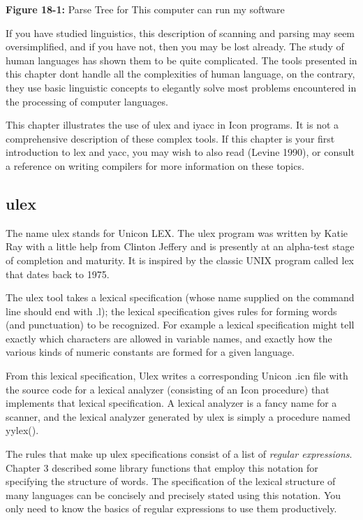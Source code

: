 {\sffamily\bfseries Figure 18-1:}
{\sffamily Parse Tree for {\textquotedbl}This computer can run my
software{\textquotedbl}}

\bigskip

If you have studied linguistics, this description of scanning and
parsing may seem oversimplified, and if you have not, then
you may be lost already.  The study of human languages has shown them
to be quite complicated.  The tools presented in this chapter
don{\textquotesingle}t handle all the complexities of human language,
on the contrary, they use basic linguistic concepts to elegantly solve
most problems encountered in the processing of computer languages.

This chapter illustrates the use of \textsf{ulex} and
\textsf{iyacc} in Icon programs. It is not a comprehensive description
of these complex tools. If this chapter is your first introduction to
\textsf{lex} and \textsf{yacc}, you may wish to also read (Levine
1990), or consult a reference on writing compilers for more information
on these topics.

\subsection{ulex}

The name \textsf{ulex} stands for Unicon LEX. The \textsf{ulex}
program was written by Katie Ray with a little help from Clinton Jeffery
and is presently at an alpha-test stage of completion and maturity.
It is inspired by the classic UNIX program called \textsf{lex} that
dates back to 1975.

The \textsf{ulex} tool takes a lexical specification (whose
name supplied on the command line should end with .l); the lexical
specification gives rules for forming words (and punctuation) to
be recognized.  For example a lexical specification might tell exactly
which characters are allowed in variable names, and exactly how the
various kinds of numeric constants are formed for a given language.

From this lexical specification, Ulex writes a corresponding Unicon
.icn file with the source code for a lexical analyzer (consisting of
an Icon procedure) that implements that lexical
specification. A lexical analyzer is a fancy name for a scanner, and the
lexical analyzer generated by \textsf{ulex} is simply a procedure named
\textsf{yylex()}.

The rules that make up
\textsf{ulex} specifications consist of a list of {\em regular expressions\/}.
Chapter 3 described some library functions that employ  this notation for specifying the structure
of words. The specification of the lexical structure of many languages
can be concisely and precisely stated using this notation. You only
need to know the basics of regular expressions to use them productively.

